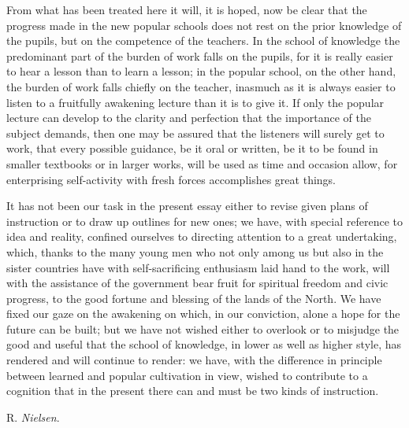 \documentclass[12pt,a4paper,openany]{book}
\newcommand{\opage}[1]{\marginnote{\footnotesize\textit{[#1]}}}
\newcommand{\signature}[1]{\par\smallskip\hfill #1\hspace*{2em}\par}
\begin{document}
From what has been treated here it will, it is hoped, now be
clear that the progress made in the new popular schools
does not rest on the prior knowledge of the pupils, but
on the competence of the teachers. In the school of knowledge the
predominant part of the burden of work falls on the pupils, for it
is really easier to hear a lesson than to learn
a lesson; in the popular school, on the other hand, the burden of work
falls chiefly on the teacher, inasmuch as it is always easier
to listen to a fruitfully awakening lecture than it is
to give it. If only the popular lecture can develop
to the clarity and perfection that the importance of the subject
demands, then one may be assured that the listeners
will surely get to work, that every possible
guidance, be it oral or written, be it
\setcounter{footnote}{0}%
\opage{441}to be found in smaller textbooks or in larger works, will
be used as time and occasion allow, for enterprising self-activity
with fresh forces accomplishes great things.

It has not been our task in the present essay
either to revise given plans of instruction or
to draw up outlines for new ones; we have, with special reference to
idea and reality, confined ourselves to directing attention
to a great undertaking, which, thanks to
the many young men who not only among us but also
in the sister countries have with self-sacrificing enthusiasm laid
hand to the work, will with the assistance of the government bear
fruit for spiritual freedom and civic progress,
to the good fortune and blessing of the lands of the North. We have
fixed our gaze on the awakening on which, in our conviction,
alone a hope for the future can be built;
but we have not wished either to overlook or to misjudge
the good and useful that the school of knowledge,
in lower as well as higher style, has rendered and will continue
to render: we have, with the difference in principle between
learned and popular cultivation in view, wished to contribute to a
cognition that in the present there can and must be
two kinds of instruction.
\signature{R. \emph{Nielsen}.}
\end{document}
